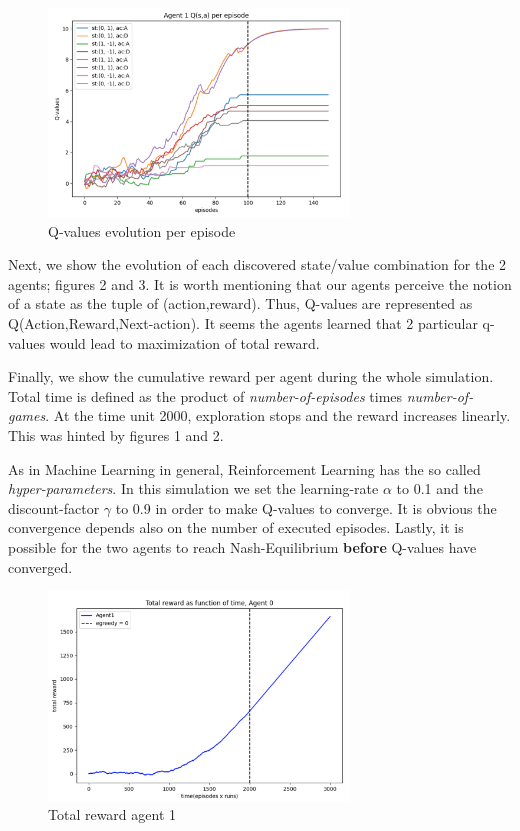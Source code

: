 \documentclass[10pt,a4paper,twocolumn]{article}
\begin{document}
	\begin{figure}[ht!]
		\centering
		\includegraphics[width=80mm]{q_values_agent1}
		\caption{Q-values evolution per episode \label{overflow}}
	\end{figure}
	
	Next, we show the evolution of each discovered state/value combination for the 2 agents; figures 2 and 3. It is worth mentioning that our agents perceive the notion of a state as the tuple of (action,reward). Thus, Q-values are represented as Q(Action,Reward,Next-action). It seems the agents learned that 2 particular q-values would lead to maximization of total reward.
	
	Finally, we show the cumulative reward per agent during the whole simulation. Total time is defined as the product of \textit{number-of-episodes} times \textit{number-of-games}. At the time unit 2000, exploration stops and the reward increases linearly. This was hinted by figures 1 and 2. 
	
	As in Machine Learning in general, Reinforcement Learning has the so called \textit{hyper-parameters}. In this simulation we set the learning-rate $\alpha$ to 0.1 and the discount-factor $\gamma$ to 0.9 in order to make Q-values to converge. It is obvious the convergence depends also on the number of executed episodes. Lastly, it is possible for the two agents to reach Nash-Equilibrium \textbf{before} Q-values have converged.
	
	
	\begin{figure}[ht!]
		\centering
		\includegraphics[width=80mm]{total_reward_agent0}
		\caption{Total reward agent 1 \label{overflow}}
	\end{figure}
\end{document}
